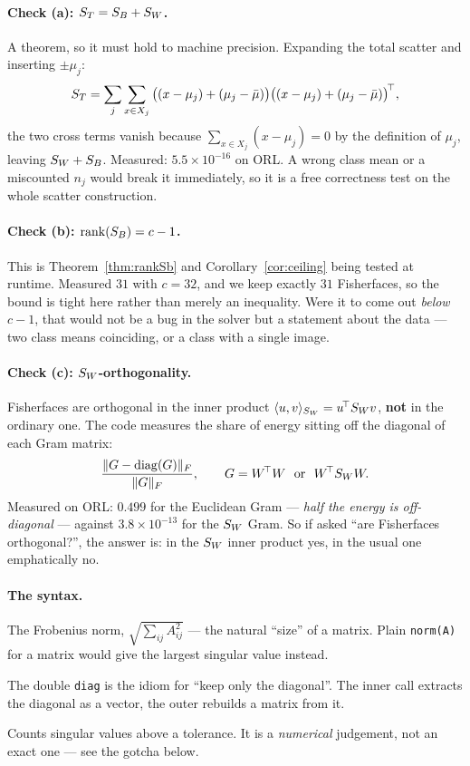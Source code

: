 \paragraph{Check (a): $S_T = S_B + S_W$.} A theorem, so it must hold to machine
precision. Expanding the total scatter and inserting $\pm\mu_j$:
\[
  S_T = \sum_j \sum_{x\in X_j} \big((x - \mu_j) + (\mu_j - \bar\mu)\big)
                              \big((x - \mu_j) + (\mu_j - \bar\mu)\big)^{\!\top},
\]
the two cross terms vanish because $\sum_{x \in X_j}(x - \mu_j) = 0$ by the
definition of $\mu_j$, leaving $S_W + S_B$. Measured: $5.5\times10^{-16}$ on
ORL. A wrong class mean or a miscounted $n_j$ would break it immediately, so it
is a free correctness test on the whole scatter construction.

\paragraph{Check (b): $\operatorname{rank}(S_B) = c-1$.} This is
Theorem~\ref{thm:rankSb} and Corollary~\ref{cor:ceiling} being tested at
runtime. Measured $31$ with $c = 32$, and we keep exactly $31$ Fisherfaces, so
the bound is tight here rather than merely an inequality. Were it to come out
\emph{below} $c-1$, that would not be a bug in the solver but a statement about
the data --- two class means coinciding, or a class with a single image.

\paragraph{Check (c): $S_W$-orthogonality.} Fisherfaces are orthogonal in the
inner product $\langle u,v\rangle_{S_W} = u^{\!\top}S_W v$, \textbf{not} in the
ordinary one. The code measures the share of energy sitting off the diagonal of
each Gram matrix:
\[
  \frac{\|G - \operatorname{diag}(G)\|_F}{\|G\|_F},
  \qquad G = W^{\!\top}W \ \text{ or } \ W^{\!\top}S_W W .
\]
Measured on ORL: $0.499$ for the Euclidean Gram --- \emph{half the energy is
off-diagonal} --- against $3.8\times10^{-13}$ for the $S_W$ Gram. So if asked
``are Fisherfaces orthogonal?'', the answer is: in the $S_W$ inner product yes,
in the usual one emphatically no.

\paragraph{The syntax.}
\begin{description}[leftmargin=*,style=nextline,nosep]
\item[\texttt{norm(A,'fro')}] The Frobenius norm,
  $\sqrt{\sum_{ij}A_{ij}^2}$ --- the natural ``size'' of a matrix. Plain
  \texttt{norm(A)} for a matrix would give the largest singular value instead.
\item[\texttt{diag(diag(G))}] The double \texttt{diag} is the idiom for
  ``keep only the diagonal''. The inner call extracts the diagonal as a vector,
  the outer rebuilds a matrix from it.
\item[\texttt{rank(A)}] Counts singular values above a tolerance. It is a
  \emph{numerical} judgement, not an exact one --- see the gotcha below.
\end{description}

